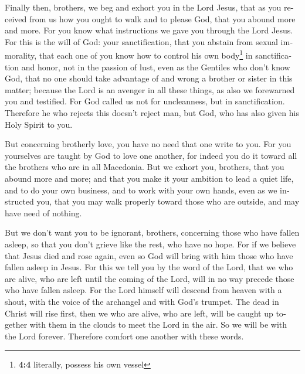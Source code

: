 \begin{paracol}{2}
\begin{otherlanguage}{english}
 Finally then, brothers, we beg and exhort you in the Lord
Jesus, that as you received from us how you ought to walk and to please
God, that you abound more and more.  For you know what
instructions we gave you through the Lord Jesus.  For this
is the will of God: your sanctification, that you abstain from sexual
immorality,  that each one of you know how to control his
own body\footnote{\textbf{4:4} literally, possess his own vessel} in
sanctification and honor,  not in the passion of lust,
even as the Gentiles who don't know God,  that no one
should take advantage of and wrong a brother or sister in this matter;
because the Lord is an avenger in all these things, as also we
forewarned you and testified.  For God called us not for
uncleanness, but in sanctification.  Therefore he who
rejects this doesn't reject man, but God, who has also given his Holy
Spirit to you.

 But concerning brotherly love, you have no need that one
write to you. For you yourselves are taught by God to love one another,
 for indeed you do it toward all the brothers who are in
all Macedonia. But we exhort you, brothers, that you abound more and
more;  and that you make it your ambition to lead a quiet
life, and to do your own business, and to work with your own hands, even
as we instructed you,  that you may walk properly toward
those who are outside, and may have need of nothing.

 But we don't want you to be ignorant, brothers,
concerning those who have fallen asleep, so that you don't grieve like
the rest, who have no hope.  For if we believe that Jesus
died and rose again, even so God will bring with him those who have
fallen asleep in Jesus.  For this we tell you by the word
of the Lord, that we who are alive, who are left until the coming of the
Lord, will in no way precede those who have fallen asleep.
 For the Lord himself will descend from heaven with a
shout, with the voice of the archangel and with God's trumpet. The dead
in Christ will rise first,  then we who are alive, who
are left, will be caught up together with them in the clouds to meet the
Lord in the air. So we will be with the Lord forever. 
Therefore comfort one another with these words.

\end{otherlanguage}


\end{paracol}
